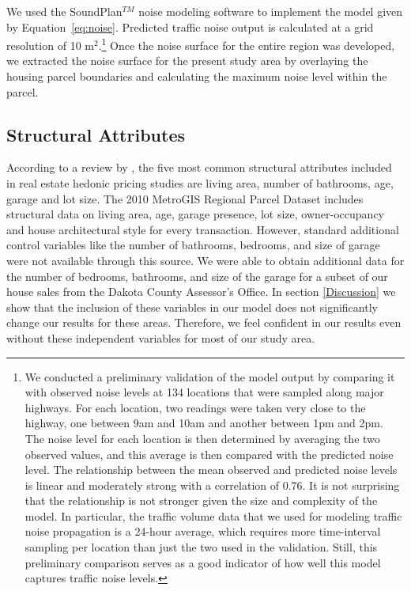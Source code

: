\documentclass{article}\usepackage{graphicx, color}
\begin{document}
We used the SoundPlan$^{TM}$ noise modeling software to implement the model given by Equation~\eqref{eq:noise}. Predicted traffic noise output is calculated at a grid resolution of 10 m$^2$.\footnote{We conducted a preliminary validation of the model output by comparing it with observed noise levels at 134 locations that were sampled along major highways. For each location, two readings were taken very close to the highway, one between 9am and 10am and another between 1pm and 2pm. The noise level for each location is then determined by averaging the two observed values, and this average is then compared with the predicted noise level. The relationship between the mean observed and predicted noise levels is linear and moderately strong with a correlation of 0.76. It is not surprising that the relationship is not stronger given the size and complexity of the model. In particular, the traffic volume data that we used for modeling traffic noise propagation is a 24-hour average, which requires more time-interval sampling per location than just the two used in the validation. Still, this preliminary comparison serves as a good indicator of how well this model captures traffic noise levels.} Once the noise surface for the entire region was developed, we extracted the noise surface for the present study area by overlaying the housing parcel boundaries and calculating the maximum noise level within the parcel.

\subsection{Structural Attributes}
According to a review by \cite{Wilhelmsson2000}, the five most common structural attributes included in real estate hedonic pricing studies are living area, number of bathrooms, age, garage and lot size.  The 2010 MetroGIS Regional Parcel Dataset includes structural data on living area, age, garage presence, lot size, owner-occupancy and house architectural style for every transaction. However, standard additional control variables like the number of bathrooms, bedrooms, and size of garage were not available through this source. We were able to obtain additional data for the number of bedrooms, bathrooms, and size of the garage for a subset of our house sales from the Dakota County Assessor's Office. In section \ref{Discussion} we show that the inclusion of these variables in our model does not significantly change our results for these areas. Therefore, we feel confident in our results even without these independent variables for most of our study area. %
\end{document}
